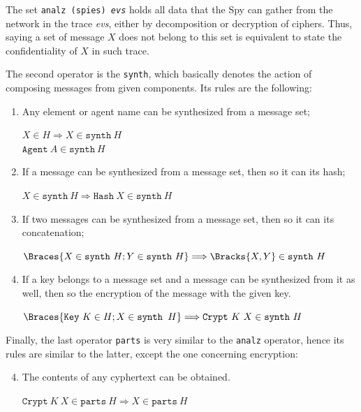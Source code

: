 The set \texttt{analz (spies) \textit{evs}} holds all data that the Spy can gather from the network in the trace \textit{evs}, either by decomposition or decryption of ciphers. Thus, saying a set of message \(X\) does not belong to this set is equivalent to state the confidentiality of \(X\) in such trace.

The second operator is the \texttt{synth}, which basically denotes the action of composing messages from given components. Its rules are the following:

\begin{enumerate}
  \item Any element or agent name can be synthesized from a message set;
  \begin{center}
    \(X \in H \Longrightarrow X \in \texttt{synth}\ H\) \\
    \(\texttt{Agent}\ A \in \texttt{synth}\ H\)
  \end{center}

  \item If a message can be synthesized from a message set, then so it can its hash;
  \begin{center}
    \(X \in \texttt{synth}\ H \Longrightarrow \texttt{Hash}\ X \in \texttt{synth}\ H\)
  \end{center}

  \item If two messages can be synthesized from a message set, then so it can its concatenation;
  \begin{center}
    \(\Braces{X \in \texttt{synth}\ H; Y \in \texttt{synth}\ H} \Longrightarrow \Bracks{X,Y} \in \texttt{synth}\ H\)
  \end{center}

  \item If a key belongs to a message set and a message can be synthesized from it as well, then so the encryption of the message with the given key.
  \begin{center}
    \(\Braces{\texttt{Key}\ K \in H; X \in \texttt{synth } H} \Longrightarrow \texttt{Crypt}\ K\ X \in \texttt{synth}\ H\)
  \end{center}
\end{enumerate}

Finally, the last operator \texttt{parts} is very similar to the \texttt{analz} operator, hence its rules are similar to the latter, except the one concerning encryption:

\begin{enumerate} \setcounter{enumi}{3}
  \item The contents of any cyphertext can be obtained.
  \begin{center}
    \(\texttt{Crypt}\ K\ X \in \texttt{parts}\ H \Longrightarrow X \in \texttt{parts}\ H\)
  \end{center}
\end{enumerate}

